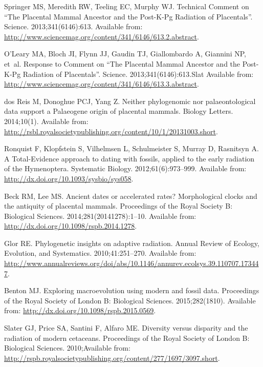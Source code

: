 \documentclass[12pt,letterpaper]{article}
\begin{document}
\begin{thebibliography}{10}
Springer MS, Meredith RW, Teeling EC, Murphy WJ.
\newblock Technical Comment on “The Placental Mammal Ancestor and the
  Post-{K}-{P}g Radiation of Placentals”.
\newblock Science. 2013;341(6146):613.
\newblock Available from:
  \url{http://www.sciencemag.org/content/341/6146/613.2.abstract}.

O'Leary MA, Bloch JI, Flynn JJ, Gaudin TJ, Giallombardo A, Giannini NP, et~al.
\newblock Response to Comment on “The Placental Mammal Ancestor and the
  Post-{K}-{P}g Radiation of Placentals”.
\newblock Science. 2013;341(6146):613.Slat
\newblock Available from:
  \url{http://www.sciencemag.org/content/341/6146/613.3.abstract}.

dos Reis M, Donoghue PCJ, Yang Z.
\newblock Neither phylogenomic nor palaeontological data support a {P}alaeogene
  origin of placental mammals.
\newblock Biology Letters. 2014;10(1).
\newblock Available from:
  \url{http://rsbl.royalsocietypublishing.org/content/10/1/20131003.short}.

Ronquist F, Klopfstein S, Vilhelmsen L, Schulmeister S, Murray D, Rasnitsyn A.
\newblock A {T}otal-{E}vidence approach to dating with fossils, applied to the
  early radiation of the {H}ymenoptera.
\newblock Systematic Biology. 2012;61(6):973--999.
\newblock Available from: \url{http://dx.doi.org/10.1093/sysbio/sys058}.

Beck RM, Lee MS.
\newblock Ancient dates or accelerated rates? {M}orphological clocks and the
  antiquity of placental mammals.
\newblock Proceedings of the Royal Society B: Biological Sciences.
  2014;281(20141278):1--10.
\newblock Available from: \url{http://dx.doi.org/10.1098/rspb.2014.1278}.

Glor RE.
\newblock Phylogenetic insights on adaptive radiation.
\newblock Annual Review of Ecology, Evolution, and Systematics.
  2010;41:251--270.
\newblock Available from:
  \url{http://www.annualreviews.org/doi/abs/10.1146/annurev.ecolsys.39.110707.173447}.

Benton MJ.
\newblock Exploring macroevolution using modern and fossil data.
\newblock Proceedings of the Royal Society of London B: Biological Sciences.
  2015;282(1810).
\newblock Available from: \url{http://dx.doi.org/10.1098/rspb.2015.0569}.

Slater GJ, Price SA, Santini F, Alfaro ME.
\newblock Diversity versus disparity and the radiation of modern cetaceans.
\newblock Proceedings of the Royal Society of London B: Biological Sciences.
  2010;Available from:
  \url{http://rspb.royalsocietypublishing.org/content/277/1697/3097.short}.


\end{thebibliography}
\end{document}
